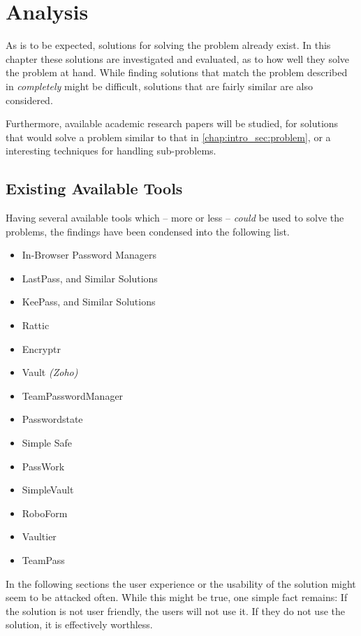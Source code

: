 \chapter{Analysis}
\label{chap:analysis}
	As is to be expected, solutions for solving the problem already exist. In this chapter these solutions are investigated and evaluated, as to how well they solve the problem at hand. While finding solutions that match the problem described in  \emph{completely} might be difficult, solutions that are fairly similar are also considered.

	Furthermore, available academic research papers will be studied, for solutions that would solve a problem similar to that in \ref{chap:intro_sec:problem}, or a interesting techniques for handling sub-problems.

	\section{Existing Available Tools}
		Having several available tools which -- more or less -- \emph{could} be used to solve the problems, the findings have been condensed into the following list.
		\begin{itemize}
			\item In-Browser Password Managers
			\item LastPass, and Similar Solutions
			\item KeePass, and Similar Solutions
			\item Rattic
			\item Encryptr
			\item Vault \emph{(Zoho)}
			\item TeamPasswordManager
			\item Passwordstate
			\item Simple Safe
			\item PassWork
			\item SimpleVault
			\item RoboForm
			\item Vaultier
			\item TeamPass 
		\end{itemize}
		In the following sections the user experience or the usability of the solution might seem to be attacked often. While this might be true, one simple fact remains: If the solution is not user friendly, the users will not use it. If they do not use the solution, it is effectively worthless.


